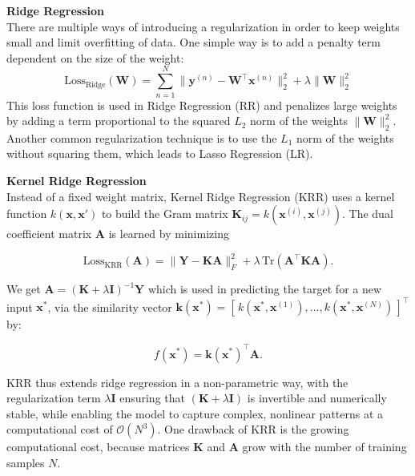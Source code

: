 \textbf{Ridge Regression}\\
There are multiple ways of introducing a regularization in order to keep weights small and limit overfitting of data. One simple way is to add a penalty term dependent on the size of the weight: 
\begin{equation}
    \label{eq:regularized_least_squares_error}
    \text{Loss}_\text{Ridge}(\mathbf{W}) = \sum_{n=1}^{N}\|\mathbf{y}^{(n)} - \mathbf{W^\top} \mathbf{x}^{(n)}\|_2^2 + \lambda \|\mathbf{W}\|_2^2
\end{equation}
This loss function is used in Ridge Regression (RR) and penalizes large weights by adding a term proportional to the squared $L_2$ norm of the weights $\|\mathbf{W}\|_2^2$. Another common regularization technique is to use the $L_1$ norm of the weights without squaring them, which leads to Lasso Regression (LR). 

\textbf{Kernel Ridge Regression}\\ %
Instead of a fixed weight matrix, Kernel Ridge Regression (KRR) uses a kernel function $k(\mathbf{x}, \mathbf{x}')$ to build the Gram matrix $\mathbf{K}_{ij} = k(\mathbf{x}^{(i)}, \mathbf{x}^{(j)})$. The dual coefficient matrix $\mathbf{A}$ is learned by minimizing

\begin{equation}
\label{eq:kernel_ridge_loss}
\mathrm{Loss}_{\mathrm{KRR}}(\mathbf{A})
= \|\mathbf{Y} - \mathbf{K}\mathbf{A}\|_F^2 + \lambda\,\mathrm{Tr}(\mathbf{A}^\top \mathbf{K}\mathbf{A}).
\end{equation}

We get $\mathbf{A} = (\mathbf{K} + \lambda \mathbf{I})^{-1} \mathbf{Y}$ which is used in predicting the target for a new input $\mathbf{x}^*$, via the similarity vector $\mathbf{k}(\mathbf{x}^*) = [\,k(\mathbf{x}^*,\mathbf{x}^{(1)}),\dots,k(\mathbf{x}^*,\mathbf{x}^{(N)})\,]^\top$ by:

\begin{equation}
\label{eq:kernel_ridge_predict}
f(\mathbf{x}^*) = \mathbf{k}(\mathbf{x}^*)^\top \mathbf{A}.
\end{equation}

KRR thus extends ridge regression in a non-parametric way, with the regularization term $\lambda \mathbf{I}$ ensuring that $(\mathbf{K} + \lambda \mathbf{I})$ is invertible and numerically stable, while enabling the model to capture complex, nonlinear patterns at a computational cost of $\mathcal{O}(N^3)$. One drawback of KRR is the growing computational cost,  because matrices $\mathbf{K}$ and $\mathbf{A}$ grow with the number of training samples $N$.


